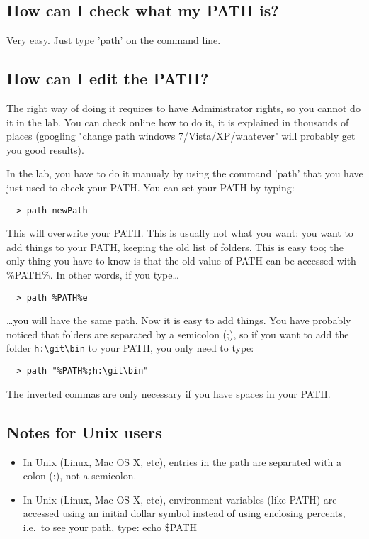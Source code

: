 \documentclass{article}
\begin{document}
\subsection{How can I check what my PATH is?}

Very easy. Just type 'path' on the command line.

\subsection{How can I edit the PATH?}

The right way of doing it requires to have Administrator rights, so
you cannot do it in the lab. You can check online how to do it, it is
explained in thousands of places (googling "change path windows
7/Vista/XP/whatever" will probably get you good results).

In the lab, you have to do it manualy by using the command 'path' that
you have 
just used to check your PATH. You can set your PATH by typing:

\begin{verbatim}
  > path newPath
\end{verbatim}


This will overwrite your PATH. This is usually not what you want: you
want to add things to your PATH, keeping the old list of folders. This
is easy too; the only thing you have to know is that the old value of
PATH can be accessed with \%PATH\%. In other words, if you type\ldots

\begin{verbatim}
  > path %PATH%e
\end{verbatim}

\ldots you will have the same path. Now it is easy to add things. You
have probably noticed that folders are separated by a semicolon (;),
so if you want to add the folder \verb+h:\git\bin+ to your PATH, you
only 
need to type:

\begin{verbatim}
  > path "%PATH%;h:\git\bin"
\end{verbatim}


The inverted commas are only necessary if you have spaces in your PATH.

\subsection{Notes for Unix users}
\label{sec:notes-unix-users}

\begin{itemize}
\item In Unix (Linux, Mac OS X, etc), entries in the path are
  separated with a colon (:), not a semicolon.
\item In Unix (Linux, Mac OS X, etc), environment variables (like
  PATH) are accessed using an initial dollar symbol instead of using
  enclosing percents, i.e.~to see your path, type: echo \$PATH
\end{itemize}
\end{document}
